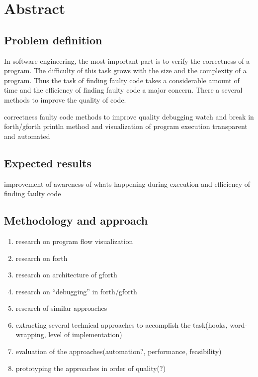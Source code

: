 \chapter*{Abstract}

\section{Problem definition}

In software engineering, the most important part is to verify the correctness of a program. The difficulty of this task grows with the size and the complexity of a program. Thus the task of finding faulty code takes a considerable amount of time and the efficiency of finding faulty code a major concern. There a several methods to improve the quality of code.

correctness
faulty code
methods to improve quality
debugging watch and break
in forth/gforth
println method and visualization of program execution
transparent and automated

\section{Expected results}

improvement of awareness of whats happening during execution and efficiency of finding faulty code

\section{Methodology and approach}

\begin{enumerate}
  \item research on program flow visualization
	\item research on forth
  \item research on architecture of gforth
  \item research on ``debugging'' in forth/gforth
  \item research of similar approaches
  \item extracting several technical approaches to accomplish the task(hooks, word-wrapping, level of implementation)
  \item evaluation of the approaches(automation?, performance, feasibility)
  \item prototyping the approaches in order of quality(?)
\end{enumerate}

